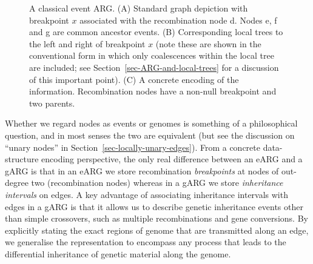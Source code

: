 \documentclass{article}
\newcommand{\noderef}[1]{\textsf{#1}}
\begin{document}
\begin{figure}
\caption{\label{fig-event-arg}
A classical event ARG. (A) Standard graph depiction with
breakpoint $x$ associated with the recombination node \noderef{d}.
Nodes \noderef{e}, \noderef{f} and \noderef{g} are common ancestor events.
(B) Corresponding local trees to the left and right of breakpoint $x$
(note these are shown in the conventional form in which only coalescences
within the local tree are included; see Section~\ref{sec-ARG-and-local-trees}
for a discussion of this important point).
(C) A concrete encoding of the information.
Recombination nodes have a non-null breakpoint
and two parents.
}
\end{figure}

Whether we regard nodes as events or genomes is something of a
philosophical question, and in most senses the two are equivalent
(but see the discussion on ``unary nodes'' in Section~\ref{sec-locally-unary-edges}).
From a concrete data-structure encoding perspective, the only real
difference between an eARG and a gARG is that in an eARG we store recombination
\emph{breakpoints} at nodes of out-degree two (recombination nodes)
whereas in a gARG we store \emph{inheritance intervals} on edges.
A key advantage of associating inheritance intervals with
edges in a gARG is that it allows us to describe genetic inheritance events other
than simple crossovers, such as multiple recombinations and
gene conversions. By explicitly stating the exact regions of genome
that are transmitted along an edge, we generalise the representation
to encompass any process that leads to the differential inheritance of
genetic material along the genome.
\end{document}
